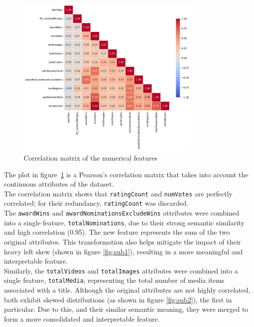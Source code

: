 \begin{figure}[H]
    \centering
    \includegraphics[width=0.8\textwidth]{plots/correlation_matrix.png}
    \caption{Correlation matrix of the numerical features}
    \label{fig:correlation_matrix}
\end{figure}

The plot in figure~\ref{fig:correlation_matrix} is a Pearson's correlation matrix that takes into
account the continuous attributes of the dataset.\\

The correlation matrix shows that \texttt{ratingCount} and \texttt{numVotes} are perfectly correlated;
for their redundancy, \texttt{ratingCount} was discarded.\\

The \texttt{awardWins} and \texttt{awardNominationsExcludeWins} attributes were combined into a single
feature, \texttt{totalNominations}, due to their strong semantic similarity and high correlation (0.95).
The new feature represents the sum of the two original attributes. This transformation also helps
mitigate the impact of their heavy left skew (shown in figure \ref{fig:sub1}), resulting in a more meaningful and interpretable feature.\\


Similarly, the \texttt{totalVideos} and \texttt{totalImages} attributes were combined into a single
feature, \texttt{totalMedia}, representing the total number of media items associated with a title.
Although the original attributes are not highly correlated, both exhibit skewed distributions (as shown in figure \ref{fig:sub2}), the first in particular.
Due to this, and their similar semantic meaning, they were merged to form a more consolidated and
interpretable feature.

